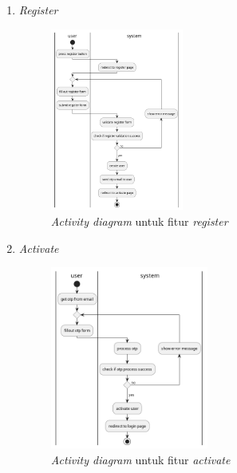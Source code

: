 \documentclass[a4paper]{article}
\begin{document}
\begin{enumerate}
    \begin{enumerate}
        \item \textit{Register}\\
        \begin{figure}[h]
            \centering
            \includegraphics*[height=6cm]{diagram/activity diagram/1. register/register.png}
            \caption{\textit{Activity diagram} untuk fitur \textit{register}}
        \end{figure}
        \item \textit{Activate}\\
        \begin{figure}[h]
            \centering
            \includegraphics*[height=6cm]{diagram/activity diagram/2. activate/activate user.png}
            \caption{\textit{Activity diagram} untuk fitur \textit{activate}}
        \end{figure}
        \newpage


\end{enumerate}
\end{enumerate}
\end{document}
